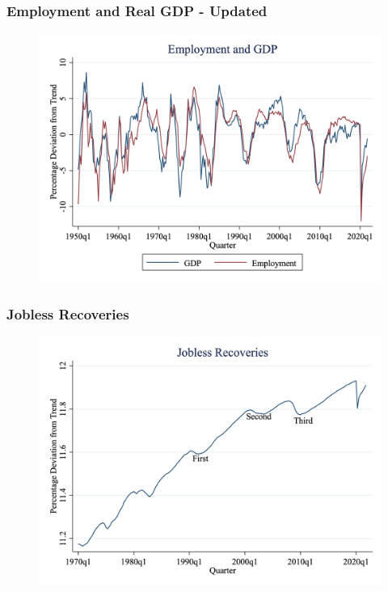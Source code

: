 \documentclass{beamer}
\begin{document}
\begin{frame}
\frametitle[alignment=center]{Employment and Real GDP - Updated}
\begin{figure}
\centering
\includegraphics[scale=0.25]{Figures/Fig_3pt13.png}
\end{figure}
\end{frame}





\begin{frame}
\frametitle[alignment=center]{Jobless Recoveries}
\begin{figure}
\centering
\includegraphics[scale=0.25]{Figures/Fig_3pt14.png}
\end{figure}
\end{frame}
\end{document}
